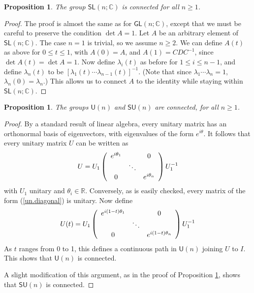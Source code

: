 \documentclass{amsbook}
\theoremstyle{plain}
\newtheorem{proposition}[theorem]{Proposition}
\numberwithin{equation}{chapter}
\numberwithin{theorem}{chapter}
\begin{document}
\begin{proposition}
\label{slnc.connect}The group $\mathsf{SL}\left(  n;\mathbb{C}\right)  $ is
connected for all $n\geq1$.
\end{proposition}

\begin{proof}
The proof is almost the same as for $\mathsf{GL}(n;\mathbb{C})$, except that
we must be careful to preserve the condition $\det A=1$. Let $A$ be an
arbitrary element of $\mathsf{SL}\left(  n;\mathbb{C}\right)  $. The case
$n=1$ is trivial, so we assume $n\geq2$. We can define $A(t)$ as above for
$0\leq t\leq1$, with $A(0)=A$, and $A(1)=CDC^{-1}$, since $\det A(t)=\det
A=1$. Now define $\lambda_{i}(t)$ as before for $1\leq i\leq n-1$, and define
$\lambda_{n}(t)$ to be $\left[  \lambda_{1}(t)\cdots\lambda_{n-1}(t)\right]
^{-1}$. (Note that since $\lambda_{1}\cdots\lambda_{n}=1$, $\lambda
_{n}(0)=\lambda_{n}$.) This allows us to connect $A$ to the identity while
staying within $\mathsf{SL}\left(  n;\mathbb{C}\right)  $.
\end{proof}

\begin{proposition}
The groups $\mathsf{U}(n)$ and $\mathsf{SU}(n)$ are connected, for all
$n\geq1$.
\end{proposition}

\begin{proof}
By a standard result of linear algebra, every unitary matrix has an
orthonormal basis of eigenvectors, with eigenvalues of the form $e^{i\theta}$.
It follows that every unitary matrix $U$ can be written as
\begin{equation}
U=U_{1}\left(
\begin{array}
[c]{ccc}%
e^{i\theta_{1}} &  & 0\\
& \ddots & \\
0 &  & e^{i\theta_{n}}%
\end{array}
\right)  U_{1}^{-1}\label{un.diagonal}%
\end{equation}
with $U_{1}$ unitary and $\theta_{i}\in\mathbb{R}$. Conversely, as is easily
checked, every matrix of the form (\ref{un.diagonal}) is unitary. Now define
\[
U(t)=U_{1}\left(
\begin{array}
[c]{ccc}%
e^{i(1-t)\theta_{1}} &  & 0\\
& \ddots & \\
0 &  & e^{i(1-t)\theta_{n}}%
\end{array}
\right)  U_{1}^{-1}%
\]
As $t$ ranges from 0 to 1, this defines a continuous path in $\mathsf{U}(n)$
joining $U$ to $I$. This shows that $\mathsf{U}(n)$ is connected.

A slight modification of this argument, as in the proof of Proposition
\ref{slnc.connect}, shows that $\mathsf{SU}(n)$ is connected.
\end{proof}
\end{document}
